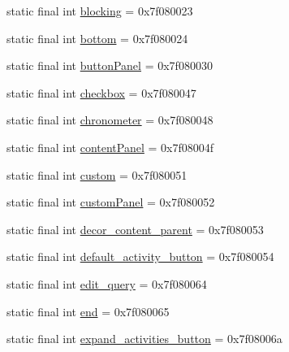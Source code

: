 \begin{DoxyCompactItemize}
\item 
static final int \mbox{\hyperlink{classandroid_1_1support_1_1v7_1_1appcompat_1_1_r_1_1id_aa1bc1c04592e5c26afa5583106c64884}{blocking}} = 0x7f080023
\item 
static final int \mbox{\hyperlink{classandroid_1_1support_1_1v7_1_1appcompat_1_1_r_1_1id_a39ef8df7a7aa59f18001c013bf910ed7}{bottom}} = 0x7f080024
\item 
static final int \mbox{\hyperlink{classandroid_1_1support_1_1v7_1_1appcompat_1_1_r_1_1id_a54c250694e2e32d9d0bffc4eb06c2a7c}{button\+Panel}} = 0x7f080030
\item 
static final int \mbox{\hyperlink{classandroid_1_1support_1_1v7_1_1appcompat_1_1_r_1_1id_ace6d05a8aeb5fac518dcec95ece0b4c2}{checkbox}} = 0x7f080047
\item 
static final int \mbox{\hyperlink{classandroid_1_1support_1_1v7_1_1appcompat_1_1_r_1_1id_afb6264939cc20738a3bda59526ecfdc6}{chronometer}} = 0x7f080048
\item 
static final int \mbox{\hyperlink{classandroid_1_1support_1_1v7_1_1appcompat_1_1_r_1_1id_a7ca9a7024cb6cfea705fe251a7e4a3ab}{content\+Panel}} = 0x7f08004f
\item 
static final int \mbox{\hyperlink{classandroid_1_1support_1_1v7_1_1appcompat_1_1_r_1_1id_a42c3f8858afe9accbfb229c5a0470024}{custom}} = 0x7f080051
\item 
static final int \mbox{\hyperlink{classandroid_1_1support_1_1v7_1_1appcompat_1_1_r_1_1id_a4f4e1a3faa478db1183ae51c17dcff31}{custom\+Panel}} = 0x7f080052
\item 
static final int \mbox{\hyperlink{classandroid_1_1support_1_1v7_1_1appcompat_1_1_r_1_1id_aea0320decb2f530b61643c8b8398f559}{decor\+\_\+content\+\_\+parent}} = 0x7f080053
\item 
static final int \mbox{\hyperlink{classandroid_1_1support_1_1v7_1_1appcompat_1_1_r_1_1id_a744e60e505fa071f1cc339c813393086}{default\+\_\+activity\+\_\+button}} = 0x7f080054
\item 
static final int \mbox{\hyperlink{classandroid_1_1support_1_1v7_1_1appcompat_1_1_r_1_1id_af94f57ae49bc17ea306089567ef89794}{edit\+\_\+query}} = 0x7f080064
\item 
static final int \mbox{\hyperlink{classandroid_1_1support_1_1v7_1_1appcompat_1_1_r_1_1id_aac9afcc19f505681aa88202a7b27d31e}{end}} = 0x7f080065
\item 
static final int \mbox{\hyperlink{classandroid_1_1support_1_1v7_1_1appcompat_1_1_r_1_1id_a322929fd47d9215e3b10b62d3762f5eb}{expand\+\_\+activities\+\_\+button}} = 0x7f08006a

\end{DoxyCompactItemize}
